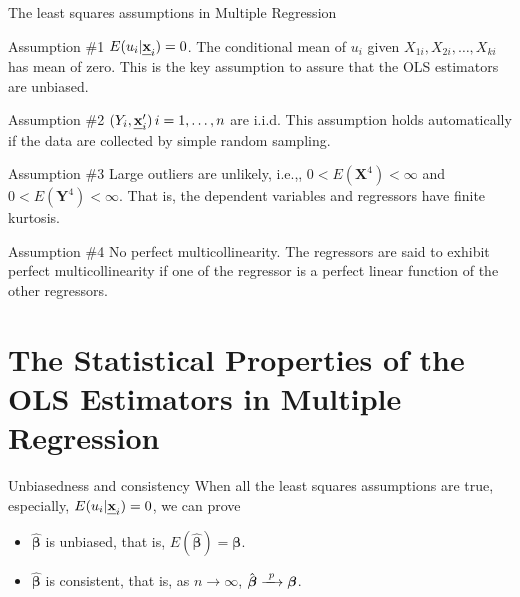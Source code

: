 \documentclass[presentation,10pt]{beamer}
\newcommand{\rarrowd}[1]{\xrightarrow{\text{ \textit #1 }}}
\def\mathbi#1{\textbf{\em #1}}
\begin{document}
\begin{frame}[label={sec:orge5f871b}]{The least squares assumptions in Multiple Regression}
\begin{block}{Assumption \#1}
\(E(u_i | \mathbi{x}_i) = 0\). The conditional mean
of \(u_i\) given \(X_{1i}, X_{2i}, \ldots, X_{ki}\) has
mean of zero. This is the key assumption to assure
that the OLS estimators are unbiased.
\end{block}

\begin{block}{Assumption \#2}
\((Y_i, \mathbi{x}_i^{\prime})\, i=1, \ldots, n\) are
i.i.d. This assumption holds automatically if the
data are collected by simple random sampling.
\end{block}

\begin{block}{Assumption \#3}
Large outliers are unlikely, i.e.,, \(0 <
E(\mathbf{X}^4) < \infty\) and \(0 < E(\mathbf{Y}^4)
< \infty\). That is, the dependent variables and
regressors have finite kurtosis.
\end{block}

\begin{block}{Assumption \#4}
No \alert{perfect multicollinearity}. The regressors are said to exhibit
perfect multicollinearity if one of the regressor is a perfect linear
function of the other regressors.
\end{block}
\end{frame}


\section{The Statistical Properties of the OLS Estimators in Multiple Regression}
\label{sec:orgdb87638}
\setcounter{tocdepth}{1}
\tableofcontents[currentsection]

\begin{frame}[label={sec:org12e1849}]{Unbiasedness and consistency}
When all the least squares assumptions are true, especially, \(E(u_i |
\mathbi{x}_i) = 0\), we can prove

\begin{itemize}
\item \(\hat{\boldsymbol{\beta}}\) is unbiased, that is,
\(E(\hat{\boldsymbol{\beta}}) = \boldsymbol{\beta}\).

\item \(\hat{\boldsymbol{\beta}}\) is consistent, that is, as \(n \rightarrow
  \infty\), \(\hat{\boldsymbol{\beta}} \rarrowd{p} \boldsymbol{\beta}\).
\end{itemize}
\end{frame}
\end{document}
